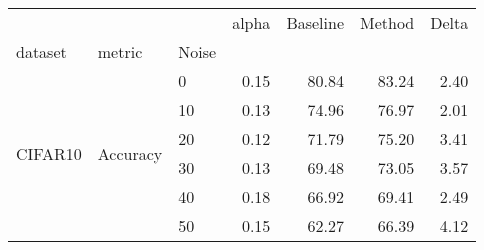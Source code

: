 \begin{tabular}{lllrrrr}
\toprule
 &  &  & alpha & Baseline & Method & Delta \\
dataset & metric & Noise &  &  &  &  \\
\midrule
\multirow[t]{6}{*}{CIFAR10} & \multirow[t]{6}{*}{Accuracy} & 0 & 0.15 & 80.84 & 83.24 & 2.40 \\
 &  & 10 & 0.13 & 74.96 & 76.97 & 2.01 \\
 &  & 20 & 0.12 & 71.79 & 75.20 & 3.41 \\
 &  & 30 & 0.13 & 69.48 & 73.05 & 3.57 \\
 &  & 40 & 0.18 & 66.92 & 69.41 & 2.49 \\
 &  & 50 & 0.15 & 62.27 & 66.39 & 4.12 \\
\cline{1-7} \cline{2-7}
\bottomrule
\end{tabular}
